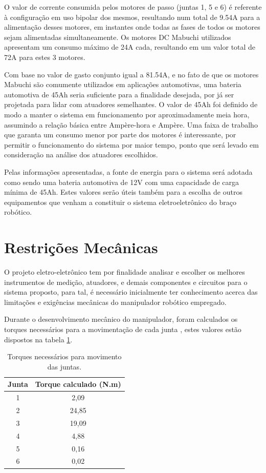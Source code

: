 O valor de corrente consumida pelos motores de passo (juntas 1, 5 e 6) é referente
à configuração em uso bipolar dos mesmos, resultando num total de 9.54A para a 
alimentação desses motores, em instantes onde todas as fases de 
todos os motores sejam alimentadas simultaneamente. 
Os motores DC Mabuchi utilizados apresentam um consumo
máximo de 24A cada, resultando em um valor total de 72A para estes 3 motores.

Com base no valor de gasto conjunto igual a 81.54A, e no fato de que os motores 
Mabuchi são comumente utilizados em aplicações automotivas, uma bateria automotiva de 45Ah
seria suficiente para a finalidade desejada, por já ser projetada para lidar com 
atuadores semelhantes. O valor de 45Ah foi definido de modo a manter o sistema em funcionamento por aproximadamente
meia hora, assumindo a relação básica entre Ampère-hora e Ampère.
Uma faixa de trabalho que garanta um consumo menor por parte dos motores é 
interessante, por permitir o funcionamento do sistema por maior tempo, 
ponto que será levado em consideração na análise dos atuadores escolhidos. 

Pelas informações apresentadas, a fonte de energia para o sistema será adotada como sendo
uma bateria automotiva de 12V com uma capacidade de carga mínima de 45Ah. Estes valores
serão úteis também para a escolha de outros equipamentos que venham
a constituir o sistema eletroeletrônico do braço robótico.

\section{Restrições Mecânicas}

O projeto eletro-eletrônico tem por finalidade analisar e escolher os melhores 
instrumentos de medição, atuadores, e demais componentes e circuitos para o sistema 
proposto, para tal, é necessário inicialmente ter conhecimento 
acerca das limitações e exigências mecânicas do manipulador robótico empregado.

Durante o desenvolvimento mecânico do manipulador, foram calculados os 
torques necessários para a movimentação de cada junta \cite{fernando2019assistivo},
estes valores estão dispostos na tabela \ref{tab:Torques}.

\begin{table}[htb]
\begin{centering}    

\caption{Torques necessários para movimento das juntas.}

\begin{tabular}{|c|c|}
    \hline
    Junta & Torque calculado (N.m) \tabularnewline
    \hline
    \hline
    1 & 2,09 \tabularnewline
    \hline
    2 & 24,85 \tabularnewline
    \hline
    3 & 19,09 \tabularnewline
    \hline
    4 & 4,88 \tabularnewline
    \hline
    5 & 0,16 \tabularnewline
    \hline
    6 & 0,02 \tabularnewline
    \hline
\end{tabular}

\label{tab:Torques}

\par\end{centering}
\end{table}

